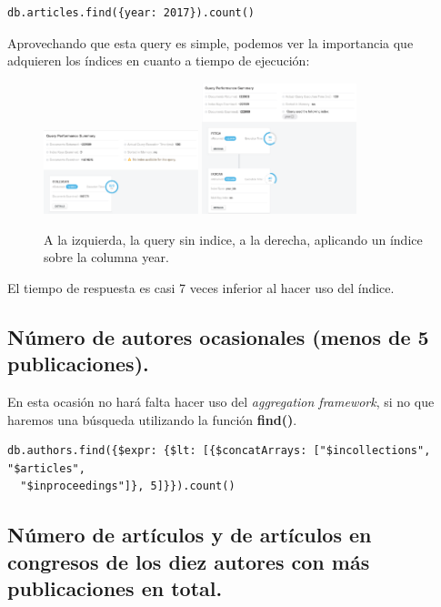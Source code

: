 \begin{verbatim}
db.articles.find({year: 2017}).count()
\end{verbatim}

Aprovechando que esta query es simple, podemos ver la importancia que adquieren los índices en cuanto a tiempo de ejecución:

\begin{figure}[H]
  \centering
    \centering
        \includegraphics[width=0.4\textwidth]{Figures/wo_year_idx}
        \includegraphics[width=0.4\textwidth]{Figures/year_idx}
  \caption{A la izquierda, la query sin indice, a la derecha, aplicando un índice sobre la columna year.}
\end{figure}

El tiempo de respuesta es casi 7 veces inferior al hacer uso del índice.

\subsection{Número de autores ocasionales (menos de 5 publicaciones).}

En esta ocasión no hará falta hacer uso del \textit{aggregation framework}, si no que haremos una búsqueda utilizando la función \textbf{find()}.

\begin{verbatim}
db.authors.find({$expr: {$lt: [{$concatArrays: ["$incollections", "$articles",
  "$inproceedings"]}, 5]}}).count()
\end{verbatim}

\subsection{Número de artículos y de artículos en congresos de los diez autores con más publicaciones en total.}

